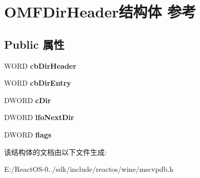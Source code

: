 \hypertarget{struct_o_m_f_dir_header}{}\section{O\+M\+F\+Dir\+Header结构体 参考}
\label{struct_o_m_f_dir_header}
\subsection*{Public 属性}
\begin{DoxyCompactItemize}
\item 
\mbox{\label{struct_o_m_f_dir_header_a5ebb8cf5a6ffaa6973947bedad60ba70}} 
W\+O\+RD {\bfseries cb\+Dir\+Header}
\item 
\mbox{\label{struct_o_m_f_dir_header_a396774d549b13d76363671b837ce9d42}} 
W\+O\+RD {\bfseries cb\+Dir\+Entry}
\item 
\mbox{\label{struct_o_m_f_dir_header_afb0106c84bca02290bb337423a43d477}} 
D\+W\+O\+RD {\bfseries c\+Dir}
\item 
\mbox{\label{struct_o_m_f_dir_header_ac0a98af1ecd797e0b038bf9532a1b0c7}} 
D\+W\+O\+RD {\bfseries lfo\+Next\+Dir}
\item 
\mbox{\label{struct_o_m_f_dir_header_ab915da9354590f707e95de673d3ef87e}} 
D\+W\+O\+RD {\bfseries flags}
\end{DoxyCompactItemize}


该结构体的文档由以下文件生成\+:\begin{DoxyCompactItemize}
\item 
E\+:/\+React\+O\+S-\/0../sdk/include/reactos/wine/mscvpdb.\+h\end{DoxyCompactItemize}
